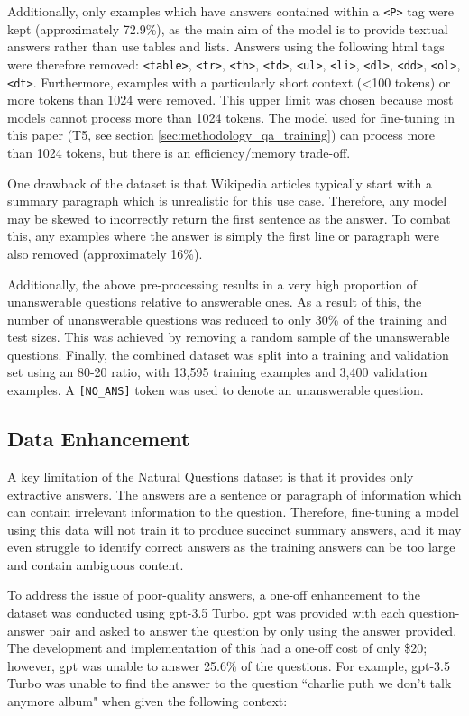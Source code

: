 Additionally, only examples which have answers contained within a \texttt{<P>} tag were kept (approximately 72.9\%), as the main aim of the model is to provide textual answers rather than use tables and lists. Answers using the following \acrshort{html} tags were therefore removed: \texttt{<table>}, \texttt{<tr>}, \texttt{<th>}, \texttt{<td>}, \texttt{<ul>}, \texttt{<li>}, \texttt{<dl>}, \texttt{<dd>}, \texttt{<ol>}, \texttt{<dt>}. Furthermore, examples with a particularly short context (<100 tokens) or more tokens than 1024 were removed. This upper limit was chosen because most models cannot process more than 1024 tokens. The model used for fine-tuning in this paper (T5, see section \ref{sec:methodology_qa_training}) can process more than 1024 tokens, but there is an efficiency/memory trade-off.

One drawback of the dataset is that Wikipedia articles typically start with a summary paragraph which is unrealistic for this use case. Therefore, any model may be skewed to incorrectly return the first sentence as the answer. To combat this, any examples where the answer is simply the first line or paragraph were also removed (approximately 16\%).

Additionally, the above pre-processing results in a very high proportion of unanswerable questions relative to answerable ones. As a result of this, the number of unanswerable questions was reduced to only 30\% of the training and test sizes. This was achieved by removing a random sample of the unanswerable questions. Finally, the combined dataset was split into a training and validation set using an 80-20 ratio, with 13,595 training examples and 3,400 validation examples. A \texttt{[NO\_ANS]} token was used to denote an unanswerable question.

\subsection{Data Enhancement}\label{sec:methodology_data_enhancement}
A key limitation of the Natural Questions dataset is that it provides only extractive answers. The answers are a sentence or paragraph of information which can contain irrelevant information to the question. Therefore, fine-tuning a model using this data will not train it to produce succinct summary answers, and it may even struggle to identify correct answers as the training answers can be too large and contain ambiguous content.

To address the issue of poor-quality answers, a one-off enhancement to the dataset was conducted using \acrshort{gpt}-3.5 Turbo. \acrshort{gpt} was provided with each question-answer pair and asked to answer the question by only using the answer provided. The development and implementation of this had a one-off cost of only \$20; however, \acrshort{gpt} was unable to answer 25.6\% of the questions. For example, \acrshort{gpt}-3.5 Turbo was unable to find the answer to the question ``charlie puth we don't talk anymore album" when given the following context:

